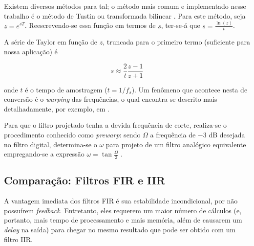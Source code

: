 Existem diversos métodos para tal; o método mais comum e implementado nesse trabalho é o método de Tustin ou transformada bilinear \cite{haykin}. Para este método, seja $z = e^{s T}$. Reescrevendo-se essa função em termos de $s$, ter-se-á que $s = \frac{\ln(z)}{t}$.

A série de Taylor em função de $z$, truncada para o primeiro termo (suficiente para nossa aplicação) é 

\begin{equation}
s \approx \dfrac{2}{t} \dfrac{z-1}{z+1}
\label{eq:tustin_formula}
\end{equation}

onde $t$ é o tempo de amostragem ($t = 1/f_s$). Um fenômeno que acontece nesta de conversão é o \textit{warping} das frequências, o qual encontra-se descrito mais detalhadamente, por exemplo, em \cite{haykin}.





Para que o filtro projetado tenha a devida frequência de corte, realiza-se o procedimento conhecido como \textit{prewarp}: sendo $\Omega$ a frequência de $-3$ dB desejada no filtro digital, determina-se o $\omega$ para projeto de um filtro analógico equivalente empregando-se a expressão $\omega = \tan{\frac{\Omega}{2}}$ \cite{haykin}.

\subsection{Comparação: Filtros FIR e IIR}
A vantagem imediata dos filtros FIR é sua estabilidade incondicional, por não possuírem \textit{feedback}. Entretanto, eles requerem um maior número de cálculos (e, portanto, mais tempo de processamento e mais memória, além de causarem um \textit{delay} na saída) para chegar no mesmo resultado que pode ser obtido com um filtro IIR.

